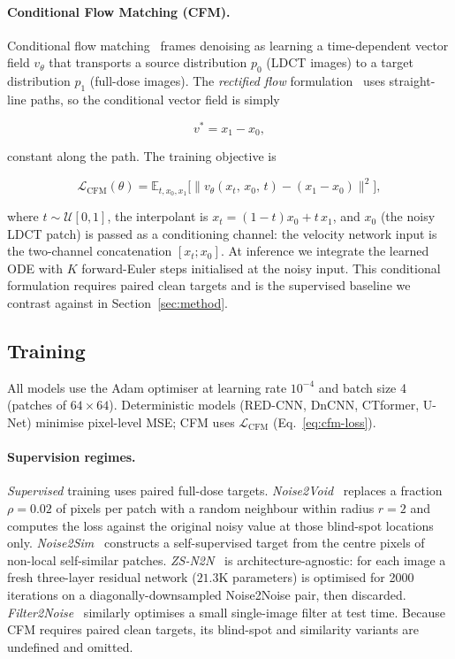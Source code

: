 \documentclass[letterpaper]{article} %
\begin{document}
\paragraph{Conditional Flow Matching (CFM).}
\label{sec:cfm}
Conditional flow matching~\cite{lipman2022flow} frames denoising as
learning a time-dependent vector field $v_\theta$ that transports a
source distribution $p_0$ (LDCT images) to a target distribution $p_1$
(full-dose images).  The \emph{rectified flow}
formulation~\cite{liu2022flow} uses straight-line paths, so the
conditional vector field is simply

\begin{equation}
  v^* = x_1 - x_0,
  \label{eq:rectified-target}
\end{equation}

constant along the path.  The training objective is

\begin{equation}
  \mathcal{L}_\text{CFM}(\theta)
  = \mathbb{E}_{t, x_0, x_1}\bigl[\|v_\theta(x_t,\, x_0,\, t) - (x_1 - x_0)\|^2\bigr],
  \label{eq:cfm-loss}
\end{equation}

where $t \sim \mathcal{U}[0,1]$, the interpolant is
$x_t = (1-t)x_0 + t\,x_1$, and $x_0$ (the noisy LDCT patch) is passed as a
conditioning channel: the velocity network input is the two-channel
concatenation $[x_t; x_0]$.  At inference we integrate the learned ODE with
$K$ forward-Euler steps initialised at the noisy input.  This conditional
formulation requires paired clean targets and is the supervised baseline we
contrast against in Section~\ref{sec:method}.

\subsection{Training}

All models use the Adam optimiser at learning rate $10^{-4}$ and batch
size 4 (patches of $64\times64$).  Deterministic models (RED-CNN, DnCNN,
CTformer, U-Net) minimise pixel-level MSE; CFM uses
$\mathcal{L}_\text{CFM}$ (Eq.~\eqref{eq:cfm-loss}).

\paragraph{Supervision regimes.}
\emph{Supervised} training uses paired full-dose targets.
\emph{Noise2Void}~\cite{krull2019noise2void} replaces a fraction
$\rho=0.02$ of pixels per patch with a random neighbour within radius
$r=2$ and computes the loss against the original noisy value at those
blind-spot locations only.  \emph{Noise2Sim}~\cite{niu2020noise2sim}
constructs a self-supervised target from the centre pixels of non-local
self-similar patches.  \emph{ZS-N2N}~\cite{mansour2023zsn2n} is
architecture-agnostic: for each image a fresh three-layer residual network
($21.3\mathrm{K}$ parameters) is optimised for 2000 iterations on a
diagonally-downsampled Noise2Noise pair, then discarded.
\emph{Filter2Noise}~\cite{sun2025filter2noise} similarly optimises a small
single-image filter at test time.  Because CFM requires paired clean
targets, its blind-spot and similarity variants are undefined and omitted.
\end{document}
